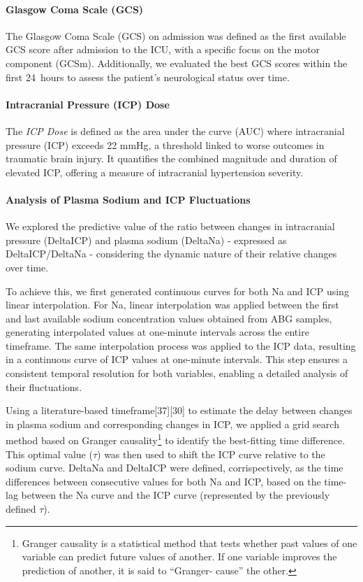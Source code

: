 \paragraph{Glasgow Coma Scale (GCS)}

The Glasgow Coma Scale (GCS) on admission was defined as the first available GCS score after admission to the ICU, with a specific focus on the motor component (GCSm)\cite{kouloulasPrognosticValueTimerelated2013}. Additionally, we evaluated the best GCS scores within the first 24~hours to assess the patient's neurological status over time. 

\paragraph{Intracranial Pressure (ICP) Dose}
The \textit{ICP Dose} is defined as the area under the curve (AUC) where intracranial pressure (ICP) exceeds 22 mmHg, a threshold linked to worse outcomes in traumatic brain injury. It quantifies the combined magnitude and duration of elevated ICP, offering a measure of intracranial hypertension severity.


\paragraph{Analysis of Plasma Sodium and ICP Fluctuations}

We explored the predictive value of the ratio between changes in intracranial pressure (DeltaICP) and plasma sodium (DeltaNa) - expressed as DeltaICP/DeltaNa - considering the dynamic nature of their relative changes over time. 

To achieve this, we first generated continuous curves for both Na and ICP using linear interpolation. For Na, linear interpolation was applied between the first and last available sodium concentration values obtained from ABG samples, generating interpolated values at one-minute intervals across the entire timeframe. The same interpolation process was applied to the ICP data, resulting in a continuous curve of ICP values at one-minute intervals. This step ensures a consistent temporal resolution for both variables, enabling a detailed analysis of their fluctuations.

Using a literature-based timeframe[37][30] to estimate the delay between changes in plasma sodium and corresponding changes in ICP, we applied a grid search method based on Granger causality\footnote{Granger causality is a statistical method that tests whether past values of one variable can predict future values of another. If one variable improves the prediction of another, it is said to “Granger- cause” the other.} to identify the best-fitting time difference. This optimal value ($\tau$) was then used to shift the ICP curve relative to the sodium curve. DeltaNa and DeltaICP were defined, corrispectively, as the time differences between consecutive values for both Na and ICP, based on the time-lag between the Na curve and the ICP curve (represented by the previously defined $\tau$).

